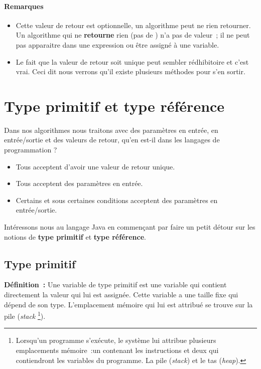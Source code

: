 		\paragraph{Remarques} 
		\begin{itemize}
			
			\item Cette valeur de retour est optionnelle, un algorithme peut ne
				rien retourner.  Un algorithme qui ne \textbf{retourne} rien
				(pas de \Gives) n’a pas de valeur~; il ne peut pas apparaitre
				dans une expression ou être assigné à une variable.  

			\item Le fait que la valeur de retour soit unique peut sembler
				rédhibitoire et c'est vrai. Ceci dit nous verrons qu'il existe
				plusieurs méthodes pour s'en sortir.
		
		\end{itemize}
		



\section{Type primitif et type référence}
	\label{primitif-reference}

	Dans nos algorithmes nous traitons avec des paramètres en entrée, en
	entrée/sortie et des valeurs de retour, qu'en est-il dans les langages de
	programmation ? 

	\begin{itemize}
		\item Tous acceptent d'avoir une valeur de retour unique.
		\item Tous acceptent des paramètres en entrée. 
		\item Certains et sous certaines conditions acceptent des paramètres en 
			entrée/sortie.
	\end{itemize}

	Intéressons nous au langage Java en commençant par faire un petit détour sur
	les notions de \textbf{type primitif} et \textbf{type référence}.

	\subsection{Type primitif}
	
	\textbf{Définition~:} 
	Une variable de type primitif est une variable qui contient directement la
	valeur qui lui est assignée.  Cette variable a une taille fixe qui dépend de
	son type. L'emplacement mémoire qui lui est attribué se trouve sur la pile
	(\textit{stack}
	\footnote{%
		Lorsqu'un programme s'exécute, le système lui attribue plusieurs
		emplacements mémoire~:un contenant les instructions et deux qui
		contiendront les variables du programme. La pile (\textit{stack}) et le
		tas (\textit{heap}).  
	}).
	

